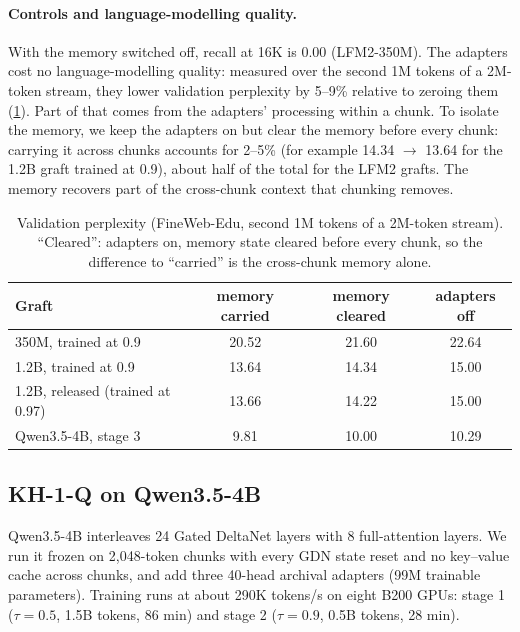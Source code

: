 \documentclass[11pt]{article}
\newcommand{\tauw}{\tau}
\newcommand{\KH}{KH-1}
\begin{document}
\paragraph{Controls and language-modelling quality.} With the memory switched off, recall at 16K is 0.00 (LFM2-350M). The adapters cost no language-modelling quality: measured over the second 1M tokens of a 2M-token stream, they lower validation perplexity by 5--9\% relative to zeroing them (\cref{tab:ppl}). Part of that comes from the adapters' processing within a chunk. To isolate the memory, we keep the adapters on but clear the memory before every chunk: carrying it across chunks accounts for 2--5\% (for example 14.34 $\to$ 13.64 for the 1.2B graft trained at 0.9), about half of the total for the LFM2 grafts. The memory recovers part of the cross-chunk context that chunking removes.

\begin{table}[t]
\centering
\small
\caption{Validation perplexity (FineWeb-Edu, second 1M tokens of a 2M-token stream). ``Cleared'': adapters on, memory state cleared before every chunk, so the difference to ``carried'' is the cross-chunk memory alone.}
\label{tab:ppl}
\begin{tabular}{@{}lccc@{}}
\toprule
Graft & memory carried & memory cleared & adapters off \\
\midrule
350M, trained at 0.9 & 20.52 & 21.60 & 22.64 \\
1.2B, trained at 0.9 & 13.64 & 14.34 & 15.00 \\
1.2B, released (trained at 0.97) & 13.66 & 14.22 & 15.00 \\
Qwen3.5-4B, stage 3 & 9.81 & 10.00 & 10.29 \\
\bottomrule
\end{tabular}
\end{table}

\subsection{\KH{}-Q on Qwen3.5-4B}
\label{sec:qwen}
Qwen3.5-4B \citep{qwen35} interleaves 24 Gated DeltaNet layers with 8 full-attention layers. We run it frozen on 2{,}048-token chunks with every GDN state reset and no key--value cache across chunks, and add three 40-head archival adapters (99M trainable parameters). Training runs at about 290K tokens/s on eight B200 GPUs: stage 1 ($\tauw = 0.5$, 1.5B tokens, 86 min) and stage 2 ($\tauw = 0.9$, 0.5B tokens, 28 min).
\end{document}
